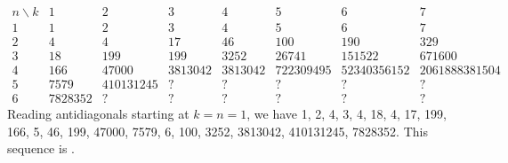 \documentclass[12pt]{amsart}
\numberwithin{equation}{section}
\theoremstyle{definition}
\begin{document}

$$\begin{array}{c|ccccccc}
   n \backslash k & 1 & 2 & 3 & 4 & 5 & 6 & 7  \\ \hline
                    1 & 1 & 2 & 3 & 4 & 5 & 6 & 7 \\
                    2 & 4 & 4 & 17 & 46 & 100 & 190 & 329 \\
                    3 & 18 & 199 & 199 & 3252 & 26741 & 151522 & 671600 \\
                    4 & 166 & 47000 & 3813042 & 3813042 & 722309495 & 52340356152 & 2061888381504\\
	              5 & 7579 & 410131245  & ?  &  ? & ? & ? & ?\\
   	              6 & 7828352  & ?  & ?  &  ? & ? & ? & ?
\end{array}$$
Reading antidiagonals starting at $k=n=1$, we have 1, 2, 4, 3, 4, 18,
4, 17, 199, 166, 5, 46, 199, 47000, 7579, 6, 100, 3252, 3813042, 410131245,
7828352.  This sequence is \cite[A374820]{oeis}.


\end{document}
